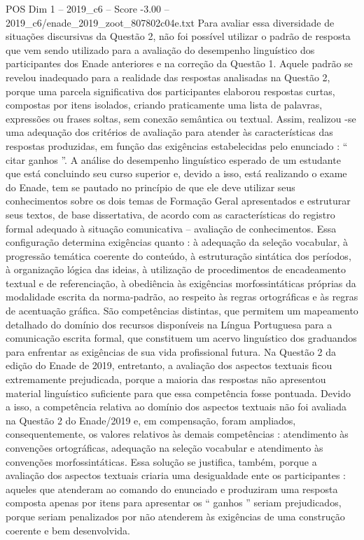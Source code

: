 \begin{textsample}{POS Dim 1 – 2019\_c6 – Score -3.00 – 2019\_c6/enade\_2019\_zoot\_807802c04e.txt}
Para avaliar essa diversidade de situações discursivas da Questão 2, não foi possível utilizar o padrão de resposta que vem sendo utilizado para a avaliação do desempenho linguístico dos participantes dos Enade anteriores e na correção da Questão 1.
Aquele padrão se revelou inadequado para a realidade das respostas analisadas na Questão 2, porque uma parcela significativa dos participantes elaborou respostas curtas, compostas por itens isolados, criando praticamente uma lista de palavras, expressões ou frases soltas, sem conexão semântica ou textual.
Assim, realizou -se uma adequação dos critérios de avaliação para atender às características das respostas produzidas, em função das exigências estabelecidas pelo enunciado : “ citar ganhos ”.
A análise do desempenho linguístico esperado de um estudante que está concluindo seu curso superior e, devido a isso, está realizando o exame do Enade, tem se pautado no princípio de que ele deve utilizar seus conhecimentos sobre os dois temas de Formação Geral apresentados e estruturar seus textos, de base dissertativa, de acordo com as características do registro formal adequado à situação comunicativa – avaliação de conhecimentos.
Essa configuração determina exigências quanto : à adequação da seleção vocabular, à progressão temática coerente do conteúdo, à estruturação sintática dos períodos, à organização lógica das ideias, à utilização de procedimentos de encadeamento textual e de referenciação, à obediência às exigências morfossintáticas próprias da modalidade escrita da norma-padrão, ao respeito às regras ortográficas e às regras de acentuação gráfica.
São competências distintas, que permitem um mapeamento detalhado do domínio dos recursos disponíveis na Língua Portuguesa para a comunicação escrita formal, que constituem um acervo linguístico dos graduandos para enfrentar as exigências de sua vida profissional futura.
Na Questão 2 da edição do Enade de 2019, entretanto, a avaliação dos aspectos textuais ficou extremamente prejudicada, porque a maioria das respostas não apresentou material linguístico suficiente para que essa competência fosse pontuada.
Devido a isso, a competência relativa ao domínio dos aspectos textuais não foi avaliada na Questão 2 do Enade/2019 e, em compensação, foram ampliados, consequentemente, os valores relativos às demais competências : atendimento às convenções ortográficas, adequação na seleção vocabular e atendimento às convenções morfossintáticas.
Essa solução se justifica, também, porque a avaliação dos aspectos textuais criaria uma desigualdade ente os participantes : aqueles que atenderam ao comando do enunciado e produziram uma resposta composta apenas por itens para apresentar os “ ganhos ” seriam prejudicados, porque seriam penalizados por não atenderem às exigências de uma construção coerente e bem desenvolvida.

\end{textsample}
